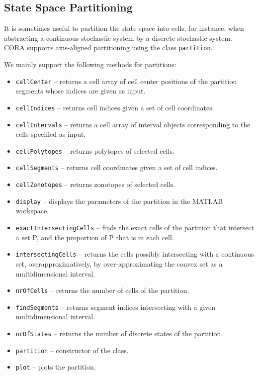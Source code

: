 \subsection{State Space Partitioning} \label{sec:partition}

It is sometimes useful to partition the state space into cells, for instance, when abstracting a continuous stochastic system by a discrete stochastic system. CORA supports axis-aligned partitioning using the class \texttt{partition}.

We mainly support the following methods for partitions:
\begin{itemize}
 \item \texttt{cellCenter} -- returns a cell array of cell center positions of the partition segments whose indices are given as input.
 \item \texttt{cellIndices} -- returns cell indices given a set of cell coordinates.
 \item \texttt{cellIntervals} -- returns a cell array of interval objects corresponding to the cells specified as input.
 \item \texttt{cellPolytopes} -- returns polytopes of selected cells.
 \item \texttt{cellSegments} -- returns cell coordinates given a set of cell indices.
 \item \texttt{cellZonotopes} -- returns zonotopes of selected cells.
 \item \texttt{display} -- displays the parameters of the partition in the MATLAB workspace.
 \item \texttt{exactIntersectingCells} -- finds the exact cells of the partition that intersect a set P, and the proportion of P that is in each cell.
 \item \texttt{intersectingCells} -- returns the cells possibly intersecting with a continuous set, overapproximatively, by over-approximating the convex set as a multidimensional interval.
 \item \texttt{nrOfCells} -- returns the number of cells of the partition.
 \item \texttt{findSegments} -- returns segment indices intersecting with a given multidimensional interval.
 \item \texttt{nrOfStates} -- returns the number of discrete states of the partition.
 \item \texttt{partition} -- constructor of the class.
 \item \texttt{plot} -- plots the partition.
\end{itemize}
